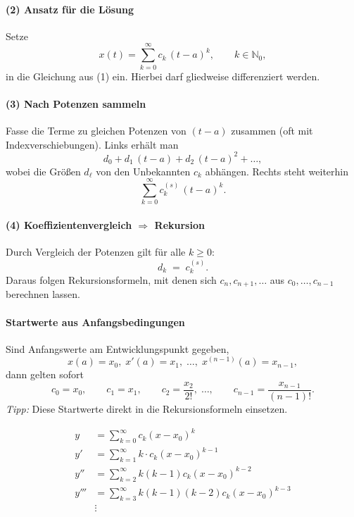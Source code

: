 \documentclass[a4paper,11pt,oneside,open=any,parskip=half, DIV=15]{scrreprt}
\begin{document}
   \paragraph{(2) Ansatz für die Lösung}
      Setze
      \[
         x(t)=\sum_{k=0}^{\infty} c_k\,(t-a)^k,\qquad k\in\mathbb{N}_0, %
      \]
      in die Gleichung aus (1) ein. Hierbei darf gliedweise differenziert werden.

   \paragraph{(3) Nach Potenzen sammeln}
      Fasse die Terme zu gleichen Potenzen von \((t-a)\) zusammen (oft mit Indexverschiebungen). Links erhält man
      \[
         d_0 + d_1\,(t-a) + d_2\,(t-a)^2 + \dots,  %
      \]
      wobei die Größen \(d_\ell\) von den Unbekannten \(c_k\) abhängen. Rechts steht weiterhin
      \[
         \sum_{k=0}^{\infty} c^{(s)}_{k}\,(t-a)^k. %
      \]

   \paragraph{(4) Koeffizientenvergleich \(\Rightarrow\) Rekursion}
      Durch Vergleich der Potenzen gilt für alle \(k\ge 0\):
      \[
         d_k \;=\; c^{(s)}_{k}.
      \]
      Daraus folgen Rekursionsformeln, mit denen sich \(c_n, c_{n+1},\dots\) aus \(c_0,\dots,c_{n-1}\) berechnen lassen.

   \paragraph{Startwerte aus Anfangsbedingungen}
      Sind Anfangswerte am Entwicklungspunkt gegeben,
      \[
         x(a)=x_0,\; x'(a)=x_1,\; \dots,\; x^{(n-1)}(a)=x_{n-1},
      \]
      dann gelten sofort
      \[
         c_0=x_0,\qquad c_1=x_1,\qquad c_2=\frac{x_2}{2!},\;\dots,\qquad
         c_{n-1}=\frac{x_{n-1}}{(n-1)!}.
      \]
      \emph{Tipp:} Diese Startwerte direkt in die Rekursionsformeln einsetzen.

   \begin{importantbox}
      \begin{align*}
         y &= \sum_{k=0}^{\infty} c_k (x-x_0)^k \\[0.5em]   %
         y' &= \sum_{k=1}^{\infty} k \cdot c_k (x-x_0)^{k-1} \\[0.5em]  %
         y'' &= \sum_{k=2}^{\infty} k(k-1) c_k (x-x_0)^{k-2} \\[0.5em]  %
         y''' &= \sum_{k=3}^{\infty} k(k-1)(k-2) c_k (x-x_0)^{k-3} \\[0.5em]  %
         &\vdots
      \end{align*}
   \end{importantbox}
\end{document}
